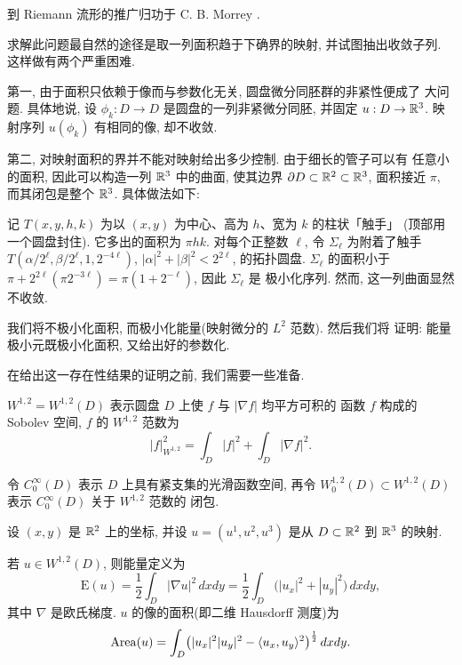 到 Riemann 流形的推广归功于 C. B. Morrey \cite{Mo1}.

求解此问题最自然的途径是取一列面积趋于下确界的映射, 并试图抽出收敛子列.
这样做有两个严重困难.

第一, 由于面积只依赖于像而与参数化无关, 圆盘微分同胚群的非紧性便成了
大问题. 具体地说, 设 $\phi_k:D\to D$ 是圆盘的一列非紧微分同胚, 并固定
$u:D\to\mathbb{R}^3$. 映射序列 $u(\phi_k)$ 有相同的像, 却不收敛.

第二, 对映射面积的界并不能对映射给出多少控制. 由于细长的管子可以有
任意小的面积, 因此可以构造一列 $\mathbb{R}^3$ 中的曲面, 使其边界
$\partial D\subset\mathbb{R}^2\subset\mathbb{R}^3$, 面积接近 $\pi$, 而其闭包是整个 $\mathbb{R}^3$.
具体做法如下:

\begin{example}
\label{ex:4.2}
记 $T(x,y,h,k)$ 为以 $(x,y)$ 为中心、高为 $h$、宽为 $k$ 的柱状「触手」
(顶部用一个圆盘封住). 它多出的面积为 $\pi hk$. 对每个正整数 $\ell$, 令
$\Sigma_\ell$ 为附着了触手 $T(\alpha/2^\ell,\beta/2^\ell,1,2^{-4\ell})$,
$|\alpha|^2+|\beta|^2<2^{2\ell}$, 的拓扑圆盘. $\Sigma_\ell$ 的面积小于
$\pi+2^{2\ell}(\pi 2^{-3\ell})=\pi(1+2^{-\ell})$, 因此 $\Sigma_\ell$ 是
极小化序列. 然而, 这一列曲面显然不收敛.
\end{example}

我们将不极小化面积, 而极小化能量(映射微分的 $L^2$ 范数). 然后我们将
证明: 能量极小元既极小化面积, 又给出好的参数化.

在给出这一存在性结果的证明之前, 我们需要一些准备.

$W^{1,2}=W^{1,2}(D)$ 表示圆盘 $D$ 上使 $f$ 与 $|\nabla f|$ 均平方可积的
函数 $f$ 构成的 Sobolev 空间, $f$ 的 $W^{1,2}$ 范数为
\begin{equation}
|f|_{W^{1,2}}^2=\int_D|f|^2+\int_D|\nabla f|^2.
\label{eq:4.1}
\end{equation}

令 $C_0^\infty(D)$ 表示 $D$ 上具有紧支集的光滑函数空间, 再令
$W_0^{1,2}(D)\subset W^{1,2}(D)$ 表示 $C_0^\infty(D)$ 关于 $W^{1,2}$ 范数的
闭包.

设 $(x,y)$ 是 $\mathbb{R}^2$ 上的坐标, 并设 $u=(u^1,u^2,u^3)$ 是从
$D\subset\mathbb{R}^2$ 到 $\mathbb{R}^3$ 的映射.

若 $u\in W^{1,2}(D)$, 则能量定义为
\begin{equation}
\mathrm{E}(u)=\frac12\int_D|\nabla u|^2\,dxdy
 =\frac12\int_D\bigl(|u_x|^2+|u_y|^2\bigr)\,dxdy,
\label{eq:4.2}
\end{equation}
其中 $\nabla$ 是欧氏梯度. $u$ 的像的面积(即二维 Hausdorff 测度)为
\begin{equation}
\operatorname{Area}(u)=\int_D\bigl(|u_x|^2|u_y|^2-\langle u_x,u_y\rangle^2\bigr)
 ^{\frac12}\,dxdy.
\label{eq:4.3}
\end{equation}

